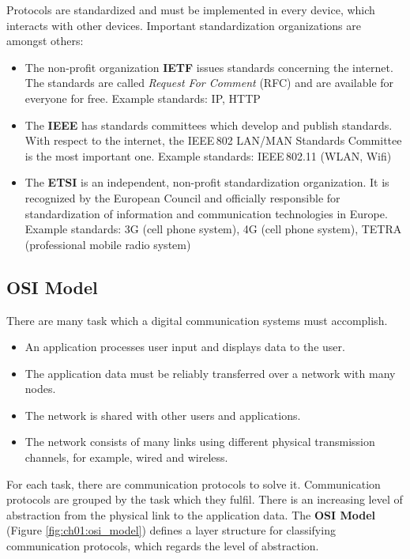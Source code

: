 \begin{refsection}
Protocols are standardized and must be implemented in every device, which interacts with other devices. Important standardization organizations are amongst others:
\begin{itemize}
	\item The non-profit organization \textbf{\acf{IETF}} issues standards concerning the internet. The standards are called \emph{Request For Comment} (RFC) and are available for everyone for free. Example standards: \ac{IP}, \ac{HTTP}
	\item The \textbf{\acf{IEEE}} has standards committees which develop and publish standards. With respect to the internet, the IEEE\,802 LAN/MAN Standards Committee is the most important one. Example standards: IEEE\,802.11 (\ac{WLAN}, Wifi)
	\item The \textbf{\acf{ETSI}} is an independent, non-profit standardization organization. It is recognized by the European Council and officially responsible for standardization of information and communication technologies in Europe. Example standards: 3G (cell phone system), 4G (cell phone system), TETRA (professional mobile radio system)
\end{itemize}


\subsection{\acs{OSI} Model}

There are many task which a digital communication systems must accomplish.
\begin{itemize}
	\item An application processes user input and displays data to the user.
	\item The application data must be reliably transferred over a network with many nodes.
	\item The network is shared with other users and applications.
	\item The network consists of many links using different physical transmission channels, for example, wired and wireless.
\end{itemize}
For each task, there are communication protocols to solve it. Communication protocols are grouped by the task which they fulfil. There is an increasing level of abstraction from the physical link to the application data. The  \textbf{\acs{OSI} Model} (Figure \ref{fig:ch01:osi_model}) defines a layer structure for classifying communication protocols, which regards the level of abstraction.


\end{refsection}
